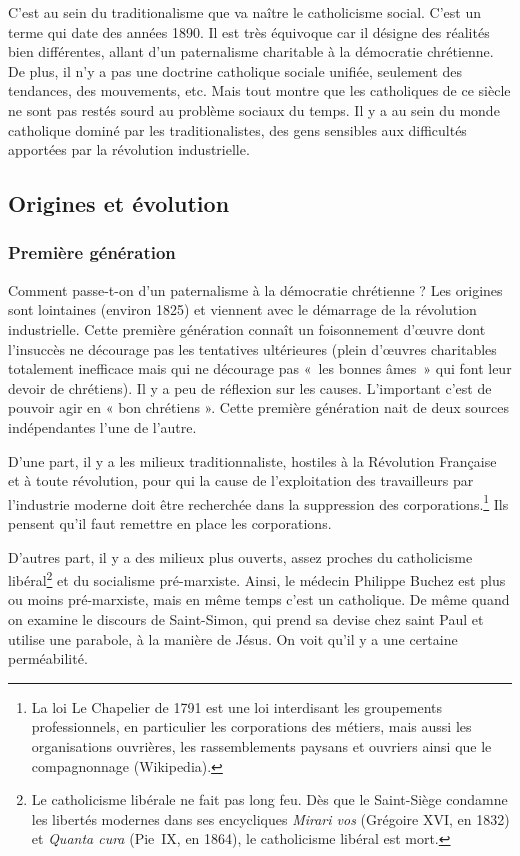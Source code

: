 \documentclass[12pt]{report}
\begin{document}
C’est au sein du traditionalisme que va naître le catholicisme social. C'est un terme qui date des années
1890. Il est très équivoque car il désigne des réalités bien différentes, allant d’un paternalisme charitable à la
démocratie chrétienne. De plus, il n’y a pas une doctrine catholique sociale unifiée,
seulement des tendances, des mouvements, etc. Mais tout montre que les catholiques de ce
siècle ne sont pas restés sourd au problème sociaux du temps. Il y a au sein du monde catholique
dominé par les traditionalistes, des gens sensibles aux difficultés apportées par la révolution
industrielle.


\subsection{Origines et évolution}

\subsubsection{Première génération}

Comment passe-t-on d’un paternalisme à la démocratie chrétienne ? Les origines sont
lointaines (environ 1825) et viennent avec le démarrage de la révolution industrielle. Cette
première génération connaît un foisonnement d’œuvre dont l’insuccès ne décourage pas les
tentatives ultérieures (plein d’œuvres charitables totalement inefficace mais qui ne décourage
pas «~les bonnes âmes~» qui font leur devoir de chrétiens). Il y a peu de réflexion sur les
causes. L’important c’est de pouvoir agir en « bon chrétiens ». Cette première génération nait
de deux sources indépendantes l’une de l’autre.

D'une part, il y a les milieux traditionnaliste, hostiles à la Révolution Française et à toute révolution, pour qui la cause de l'exploitation des travailleurs par l'industrie moderne doit être recherchée dans la suppression des corporations.\footnote{La loi Le Chapelier de 1791 est une loi interdisant les groupements professionnels, en particulier les corporations des métiers, mais aussi les organisations ouvrières, les rassemblements paysans et ouvriers ainsi que le compagnonnage (Wikipedia).}
Ils pensent qu'il faut remettre en place les corporations.

D'autres part, il y a des milieux plus ouverts, assez proches du catholicisme libéral\footnote{Le catholicisme libérale ne fait pas long feu. Dès que le Saint-Siège condamne les libertés modernes dans ses encycliques \emph{Mirari vos} (Grégoire XVI, en 1832) et \emph{Quanta cura} (Pie~IX, en 1864), le catholicisme libéral est mort.} et du socialisme pré-marxiste.
Ainsi, le médecin Philippe Buchez est plus ou moins pré-marxiste, mais en même temps c'est un catholique. De même quand on examine le discours de Saint-Simon, qui prend sa devise chez saint Paul et utilise une parabole, à la manière de Jésus. On voit qu'il y a une certaine perméabilité.
\end{document}
